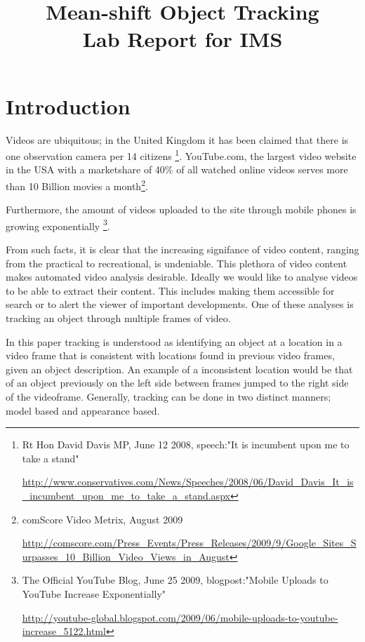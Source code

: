 \documentclass[a4paper,11pt]{article}
\title{Mean-shift Object Tracking\\ Lab Report for IMS}
\date{}
\begin{document}
\maketitle 



\section{Introduction}

	Videos are ubiquitous; in the United Kingdom it has been claimed that there is one observation camera per 14 citizens \footnote{

Rt Hon David Davis MP, June 12 2008, speech:"It is incumbent upon me to take a stand" 

\url{http://www.conservatives.com/News/Speeches/2008/06/David_Davis_It_is_incumbent_upon_me_to_take_a_stand.aspx}

}. YouTube.com, the largest video website in the USA with a marketshare of 40\% of all watched online videos serves more than 10 Billion movies a month\footnote{comScore Video Metrix, August 2009 

\url{http://comscore.com/Press_Events/Press_Releases/2009/9/Google_Sites_Surpasses_10_Billion_Video_Views_in_August}}.

	Furthermore, the amount of videos uploaded to the site through mobile phones is growing exponentially \footnote{The Official YouTube Blog, June 25 2009, blogpost:"Mobile Uploads to YouTube Increase Exponentially" 

\url{http://youtube-global.blogspot.com/2009/06/mobile-uploads-to-youtube-increase_5122.html}}. 

	From such facts, it is clear that the increasing signifance of video content, ranging from the practical to recreational, is undeniable. This plethora of video content makes automated video analysis desirable. Ideally we would like to analyse videos to be able to extract their content. This includes making them accessible for search or to alert the viewer of important developments. One of these analyses is tracking an object through multiple frames of video.



In this paper tracking is understood as identifying an object at a location in a video frame that is consistent with locations found in previous video frames, given an object description. An example of a inconsistent location would be that of an object previously on the left side between frames jumped to the right side of the videoframe. Generally, tracking can be done in two distinct manners; model based and appearance based. 
\end{document}
